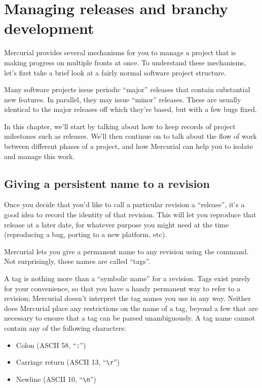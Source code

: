 \chapter{Managing releases and branchy development}
\label{chap:userfaq}

Mercurial provides several mechanisms for you to manage a project that
is making progress on multiple fronts at once.  To understand these
mechanisms, let's first take a brief look at a fairly normal software
project structure.

Many software projects issue periodic ``major'' releases that contain
substantial new features.  In parallel, they may issue ``minor''
releases.  These are usually identical to the major releases off which
they're based, but with a few bugs fixed.

In this chapter, we'll start by talking about how to keep records of
project milestones such as releases.  We'll then continue on to talk
about the flow of work between different phases of a project, and how
Mercurial can help you to isolate and manage this work.

\section{Giving a persistent name to a revision}

Once you decide that you'd like to call a particular revision a
``release'', it's a good idea to record the identity of that revision.
This will let you reproduce that release at a later date, for whatever
purpose you might need at the time (reproducing a bug, porting to a
new platform, etc).

Mercurial lets you give a permanent name to any revision using the
 command.  Not surprisingly, these names are called
``tags''.

A tag is nothing more than a ``symbolic name'' for a revision.  Tags
exist purely for your convenience, so that you have a handy permanent
way to refer to a revision; Mercurial doesn't interpret the tag names
you use in any way.  Neither does Mercurial place any restrictions on
the name of a tag, beyond a few that are necessary to ensure that a
tag can be parsed unambiguously.  A tag name cannot contain any of the
following characters:
\begin{itemize}
\item Colon (ASCII 58, ``\texttt{:}'')
\item Carriage return (ASCII 13, ``\Verb+\r+'')
\item Newline (ASCII 10, ``\Verb+\n+'')
\end{itemize}

